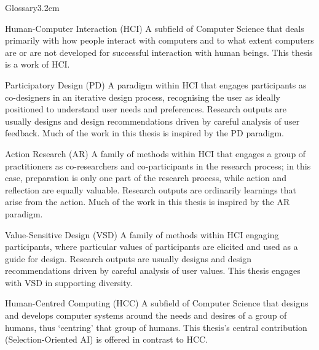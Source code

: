 


\begin{mclistof}{Glossary}{3.2cm}
    \item[Human-Computer Interaction (HCI)] A subfield of Computer Science that deals primarily with how people interact with computers and to what extent computers are or are not developed for successful interaction with human beings. This thesis is a work of HCI.

    \item[Participatory Design (PD)] A paradigm within HCI that engages participants as co-designers in an iterative design process, recognising the user as ideally positioned to understand user needs and preferences. Research outputs are usually designs and design recommendations driven by careful analysis of user feedback. Much of the work in this thesis is inspired by the PD paradigm.

    \item[Action Research (AR)] A family of methods within HCI that engages a group of practitioners as co-researchers and co-participants in the research process; in this case, preparation is only one part of the research process, while action and reflection are equally valuable. Research outputs are ordinarily learnings that arise from the action. Much of the work in this thesis is inspired by the AR paradigm.

    \item[Value-Sensitive Design (VSD)] A family of methods within HCI engaging participants, where particular values of participants are elicited and used as a guide for design. Research outputs are usually designs and design recommendations driven by careful analysis of user values. This thesis engages with VSD in supporting diversity.

    \item[Human-Centred Computing (HCC)] A subfield of Computer Science that designs and develops computer systems around the needs and desires of a group of humans, thus `centring' that group of humans. This thesis's central contribution (Selection-Oriented AI) is offered in contrast to HCC.


\end{mclistof}
